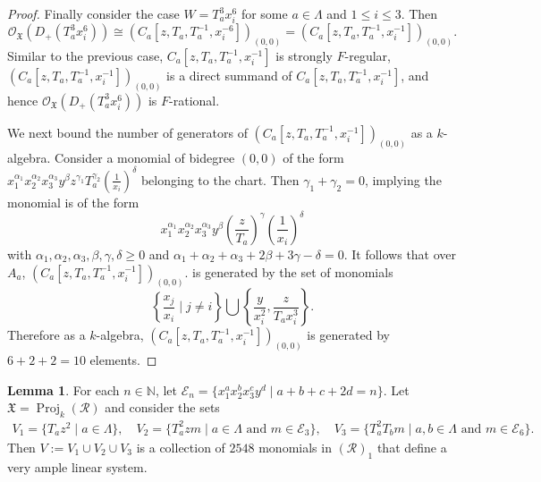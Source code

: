 \documentclass[reqno,11pt]{amsart}
\numberwithin{equation}{section}
\theoremstyle{definition}
\theoremstyle{definition}
\newtheorem{lemma}[theorem]{Lemma}
\theoremstyle{definition}
\theoremstyle{remark}
\newcommand{\NN}{\mathbb{N}}
\newcommand{\Proj}{\operatorname{Proj}}
\newcommand{\cO}{\mathcal{O}}
\begin{document}
\begin{proof}
    

    Finally consider the case $W = T_a^3x_i^6$ for some $a\in\Lambda$ and $1\leq i\leq 3$. Then
    \[
    \cO_\mathfrak{X}(D_+(T_a^3x_i^6)) \cong \left(C_a\left[z, T_a,T_a^{-1},x_i^{-6}\right]\right)_{(0,0)} = \left(C_a\left[z, T_a,T_a^{-1},x_i^{-1}\right]\right)_{(0,0)}.
    \]
    Similar to the previous case, $C_a[z, T_a,T_a^{-1},x_i^{-1}]$ is strongly $F$-regular, $\left(C_a\left[z, T_a,T_a^{-1},x_i^{-1}\right]\right)_{(0,0)}$ is a direct summand of $C_a[z, T_a,T_a^{-1},x_i^{-1}]$, and hence $\cO_\mathfrak{X}(D_+(T_a^3x_i^6))$ is $F$-rational.

     We next bound the number of generators of $\left(C_a\left[z, T_a,T_a^{-1},x_i^{-1}\right]\right)_{(0,0)}$ as a $k$-algebra. Consider a monomial of bidegree $(0,0)$ of the form $x_1^{\alpha_1}x_2^{\alpha_2}x_3^{\alpha_3}y^{\beta}z^{\gamma_1}T_a^{\gamma_2}\left(\frac{1}{x_i}\right)^{\delta}$ belonging to the chart. Then $\gamma_1+\gamma_2 = 0$, implying the monomial is of the form
    \[
    x_1^{\alpha_1}x_2^{\alpha_2}x_3^{\alpha_3}y^{\beta}\left(\frac{z}{T_a}\right)^{\gamma}\left(\frac{1}{x_i}\right)^{\delta}
    \]
    with $\alpha_1,\alpha_2,\alpha_3,\beta,\gamma,\delta\geq 0$ and $\alpha_1+\alpha_2+\alpha_3+2\beta +3\gamma - \delta = 0$.
    It follows that over $A_a$, $\left(C_a\left[z, T_a,T_a^{-1},x_i^{-1}\right]\right)_{(0,0)}.$ is generated by the set of monomials
    \[
    \left\{\frac{x_j}{x_i}\mid j\not=i\right\}\bigcup\left\{\frac{y}{x_i^2}, \frac{z}{T_ax_i^3}\right\}.
    \]
    Therefore as a $k$-algebra, $\left(C_a\left[z, T_a,T_a^{-1},x_i^{-1}\right]\right)_{(0,0)}$ is generated by $6+ 2+2 = 10$ elements.
\end{proof}


\begin{lemma}
    \label{lem: the embedding of the projective variety}
    For each $n\in\NN$, let $\mathcal{E}_n = \{x_1^ax_2^bx_3^cy^d\mid a+b+c+2d = n\}$. Let $\mathfrak{X} = \Proj_k(\mathcal{R})$ and consider the sets
\begin{align*}
    V_1 = \{T_az^2\mid a\in\Lambda\},\quad V_2 = \{T_a^2zm\mid a\in\Lambda\mbox{ and }m \in\mathcal{E}_3\}, \quad V_3 = \{T_a^2T_bm\mid a,b\in\Lambda\mbox{ and }m \in\mathcal{E}_6\}.
\end{align*}
    Then $V := V_1\cup V_2\cup V_3$ is a collection of $2548$ monomials in $\left(\mathcal{R}\right)_1$ that define a very ample linear system.
\end{lemma}
\end{document}
